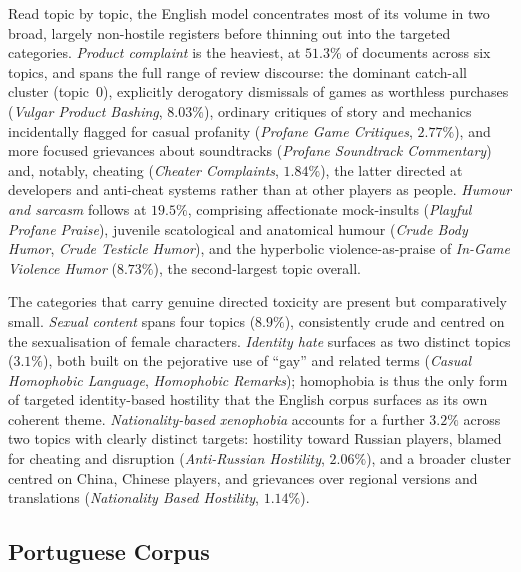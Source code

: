 Read topic by topic, the English model concentrates most of its volume in two broad, largely non-hostile registers before thinning out into the targeted categories. \emph{Product complaint} is the heaviest, at $51.3\%$ of documents across six topics, and spans the full range of review discourse: the dominant catch-all cluster (topic~0), explicitly derogatory dismissals of games as worthless purchases (\emph{Vulgar Product Bashing}, $8.03\%$), ordinary critiques of story and mechanics incidentally flagged for casual profanity (\emph{Profane Game Critiques}, $2.77\%$), and more focused grievances about soundtracks (\emph{Profane Soundtrack Commentary}) and, notably, cheating (\emph{Cheater Complaints}, $1.84\%$), the latter directed at developers and anti-cheat systems rather than at other players as people. \emph{Humour and sarcasm} follows at $19.5\%$, comprising affectionate mock-insults (\emph{Playful Profane Praise}), juvenile scatological and anatomical humour (\emph{Crude Body Humor}, \emph{Crude Testicle Humor}), and the hyperbolic violence-as-praise of \emph{In-Game Violence Humor} ($8.73\%$), the second-largest topic overall.

The categories that carry genuine directed toxicity are present but comparatively small. \emph{Sexual content} spans four topics ($8.9\%$), consistently crude and centred on the sexualisation of female characters. \emph{Identity hate} surfaces as two distinct topics ($3.1\%$), both built on the pejorative use of ``gay'' and related terms (\emph{Casual Homophobic Language}, \emph{Homophobic Remarks}); homophobia is thus the only form of targeted identity-based hostility that the English corpus surfaces as its own coherent theme. \emph{Nationality-based xenophobia} accounts for a further $3.2\%$ across two topics with clearly distinct targets: hostility toward Russian players, blamed for cheating and disruption (\emph{Anti-Russian Hostility}, $2.06\%$), and a broader cluster centred on China, Chinese players, and grievances over regional versions and translations (\emph{Nationality Based Hostility}, $1.14\%$).

\subsection{Portuguese Corpus}
\label{subsec:semantic-pt}

